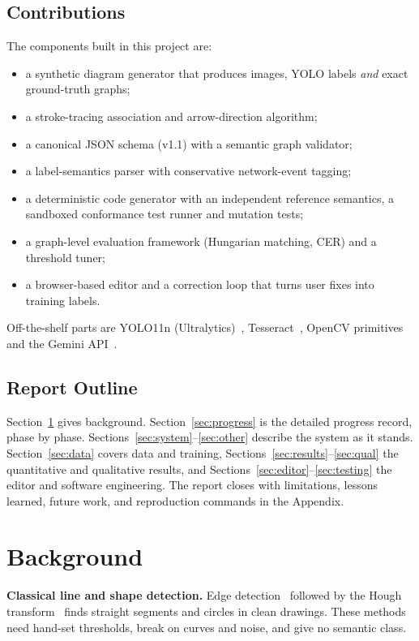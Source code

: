 \documentclass[journal,10pt]{IEEEtran}
\begin{document}
\subsection{Contributions}
The components built in this project are:
\begin{itemize}
\item a synthetic diagram generator that produces images, YOLO labels \emph{and} exact
ground-truth graphs;
\item a stroke-tracing association and arrow-direction algorithm;
\item a canonical JSON schema (v1.1) with a semantic graph validator;
\item a label-semantics parser with conservative network-event tagging;
\item a deterministic code generator with an independent reference semantics, a
sandboxed conformance test runner and mutation tests;
\item a graph-level evaluation framework (Hungarian matching, CER) and a threshold tuner;
\item a browser-based editor and a correction loop that turns user fixes into training
labels.
\end{itemize}
Off-the-shelf parts are YOLO11n (Ultralytics)~\cite{yolo11}, Tesseract~\cite{tesseract},
OpenCV primitives~\cite{opencv} and the Gemini API~\cite{gemini}.

\subsection{Report Outline}
Section~\ref{sec:background} gives background. Section~\ref{sec:progress} is the
detailed progress record, phase by phase. Sections~\ref{sec:system}--\ref{sec:other}
describe the system as it stands. Section~\ref{sec:data} covers data and training,
Sections~\ref{sec:results}--\ref{sec:qual} the quantitative and qualitative results, and
Sections~\ref{sec:editor}--\ref{sec:testing} the editor and software engineering. The
report closes with limitations, lessons learned, future work, and reproduction commands
in the Appendix.

\section{Background}
\label{sec:background}
\textbf{Classical line and shape detection.} Edge detection~\cite{canny} followed by the
Hough transform~\cite{hough} finds straight segments and circles in clean drawings. These
methods need hand-set thresholds, break on curves and noise, and give no semantic class.
\end{document}
